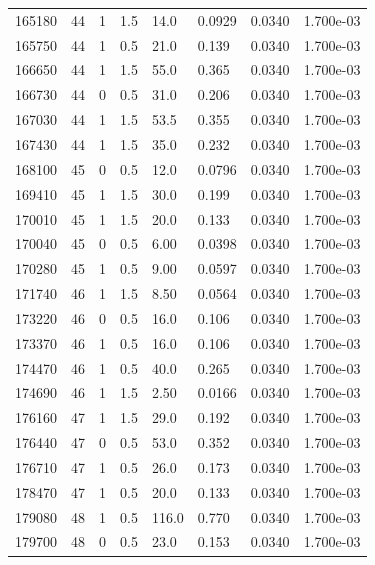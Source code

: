 \documentclass[preview]{standalone}
\begin{document}
{{{{{{\begin{tabular}{L{1.2cm}C{1.2cm} C{0.3cm}C{0.5cm} C{1.4cm}C{1.4cm} C{1.4cm}C{1.4cm}}
  165180  &    44  & 1     & 1.5 &  14.0  & 0.0929  & 0.0340 &  1.700e-03   \\ 
  165750  &    44  & 1     & 0.5 &  21.0  & 0.139  & 0.0340 &  1.700e-03   \\ 
  166650  &    44  & 1     & 1.5 &  55.0  & 0.365  & 0.0340 &  1.700e-03   \\ 
  166730  &    44  & 0     & 0.5 &  31.0  & 0.206  & 0.0340 &  1.700e-03   \\ 
  167030  &    44  & 1     & 1.5 &  53.5  & 0.355  & 0.0340 &  1.700e-03   \\ 
  167430  &    44  & 1     & 1.5 &  35.0  & 0.232  & 0.0340 &  1.700e-03   \\ 
  168100  &    45  & 0     & 0.5 &  12.0  & 0.0796  & 0.0340 &  1.700e-03   \\ 
  169410  &    45  & 1     & 1.5 &  30.0  & 0.199  & 0.0340 &  1.700e-03   \\ 
  170010  &    45  & 1     & 1.5 &  20.0  & 0.133  & 0.0340 &  1.700e-03   \\ 
  170040  &    45  & 0     & 0.5 &  6.00  & 0.0398  & 0.0340 &  1.700e-03   \\ 
  170280  &    45  & 1     & 0.5 &  9.00  & 0.0597  & 0.0340 &  1.700e-03   \\ 
  171740  &    46  & 1     & 1.5 &  8.50  & 0.0564  & 0.0340 &  1.700e-03   \\ 
  173220  &    46  & 0     & 0.5 &  16.0  & 0.106  & 0.0340 &  1.700e-03   \\ 
  173370  &    46  & 1     & 0.5 &  16.0  & 0.106  & 0.0340 &  1.700e-03   \\ 
  174470  &    46  & 1     & 0.5 &  40.0  & 0.265  & 0.0340 &  1.700e-03   \\ 
  174690  &    46  & 1     & 1.5 &  2.50  & 0.0166  & 0.0340 &  1.700e-03   \\ 
  176160  &    47  & 1     & 1.5 &  29.0  & 0.192  & 0.0340 &  1.700e-03   \\ 
  176440  &    47  & 0     & 0.5 &  53.0  & 0.352  & 0.0340 &  1.700e-03   \\ 
  176710  &    47  & 1     & 0.5 &  26.0  & 0.173  & 0.0340 &  1.700e-03   \\ 
  178470  &    47  & 1     & 0.5 &  20.0  & 0.133  & 0.0340 &  1.700e-03   \\ 
  179080  &    48  & 1     & 0.5 &  116.0  & 0.770  & 0.0340 &  1.700e-03   \\ 
  179700  &    48  & 0     & 0.5 &  23.0  & 0.153  & 0.0340 &  1.700e-03   \\ 

\end{tabular}}}}}}}
\end{document}
